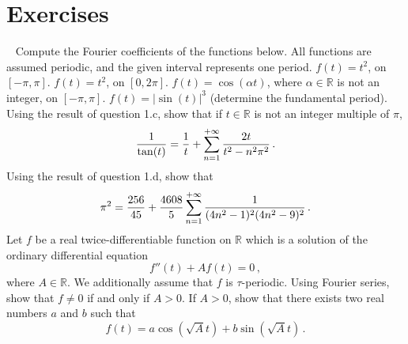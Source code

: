 \section{Exercises}
\begin{ExerciseList}
  \Exercise~
  \Question Compute the Fourier coefficients of the functions below. All functions are assumed periodic, and the given interval represents one period.
  \subQuestion $f(t)=t^2$, on $[-\pi,\pi]$.
  \subQuestion $f(t)=t^2$, on $[0,2\pi]$.
  \subQuestion $f(t)=\cos(\alpha t)$, where $\alpha\in\mathbb{R}$ is not an integer, on $[-\pi,\pi]$.
  \subQuestion $f(t)=|\sin(t)|^3$ (determine the fundamental period).
  \Question Using the result of question 1.c, show that if $t\in\mathbb{R}$ is not an integer multiple of $\pi$,
  \begin{equation}
    \frac{1}{\tan(t)}=\frac{1}{t}+\sum_{n=1}^{+\infty}\frac{2t}{t^2-n^2\pi^2}\,.
  \end{equation}
  \Question Using the result of question 1.d, show that
  \begin{equation}
    \pi^2=\frac{256}{45}+\frac{4608}{5}\sum_{n=1}^{+\infty}\frac{1}{(4n^2-1)^2(4n^2-9)^2}\,.
  \end{equation}
  \Exercise Let $f$ be a real twice-differentiable function on $\mathbb{R}$ which is
  a solution of the ordinary differential equation
  \begin{equation}
    f''(t) + A f(t) = 0\,,
  \end{equation}
  where $A\in\mathbb{R}$. We additionally assume that $f$ is $\tau$-periodic.
  \Question Using Fourier series, show that $f\neq 0$ if and only if $A>0$.
  \Question If $A>0$, show that there exists two real numbers $a$ and $b$
  such that
  \begin{equation}
    f(t)=a\cos(\sqrt{A} t)+b\sin(\sqrt{A} t)\,.
  \end{equation}
\end{ExerciseList}
